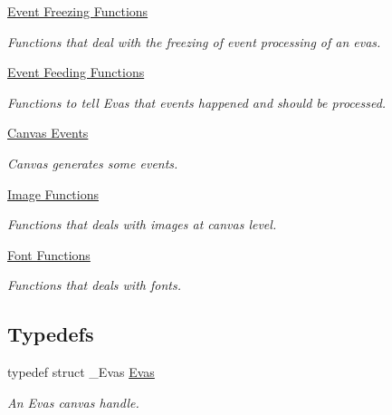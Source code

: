 \begin{DoxyCompactItemize}
\item 
\hyperlink{group__Evas__Event__Freezing__Group}{Event Freezing Functions}


\begin{DoxyCompactList}\small\item\em Functions that deal with the freezing of event processing of an evas. \item\end{DoxyCompactList}

\item 
\hyperlink{group__Evas__Event__Feeding__Group}{Event Feeding Functions}


\begin{DoxyCompactList}\small\item\em Functions to tell Evas that events happened and should be processed. \item\end{DoxyCompactList}

\item 
\hyperlink{group__Evas__Canvas__Events}{Canvas Events}


\begin{DoxyCompactList}\small\item\em Canvas generates some events. \item\end{DoxyCompactList}

\item 
\hyperlink{group__Evas__Image__Group}{Image Functions}


\begin{DoxyCompactList}\small\item\em Functions that deals with images at canvas level. \item\end{DoxyCompactList}

\item 
\hyperlink{group__Evas__Font__Group}{Font Functions}


\begin{DoxyCompactList}\small\item\em Functions that deals with fonts. \item\end{DoxyCompactList}

\end{DoxyCompactItemize}
\subsection*{Typedefs}
\begin{DoxyCompactItemize}
\item 
typedef struct \_\-Evas \hyperlink{group__Evas__Canvas_ga5ff87cc4ce6bc43e3b640a6d37f73043}{Evas}
\begin{DoxyCompactList}\small\item\em An Evas canvas handle. \item\end{DoxyCompactList}\end{DoxyCompactItemize}
